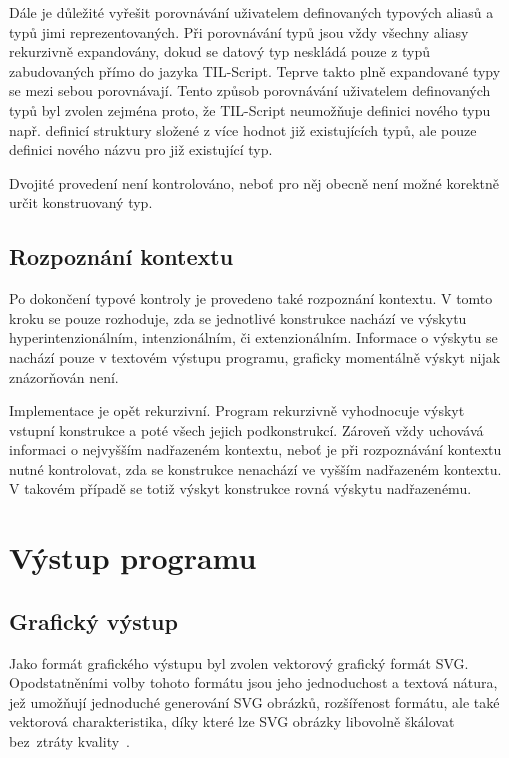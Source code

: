 \documentclass{article}
\begin{document}
Dále je důležité vyřešit porovnávání uživatelem definovaných typových aliasů a typů jimi reprezentovaných.
Při porovnávání typů jsou vždy všechny aliasy rekurzivně expandovány, dokud se datový typ neskládá pouze
z typů zabudovaných přímo do jazyka TIL-Script. Teprve takto plně expandované typy se mezi sebou porovnávají.
Tento způsob porovnávání uživatelem definovaných typů byl zvolen zejména proto, že TIL-Script neumožňuje
definici nového typu např. definicí struktury složené z více hodnot již existujících typů, ale pouze definici
nového názvu pro již existující typ.

Dvojité provedení není kontrolováno, neboť pro něj obecně není možné korektně určit konstruovaný typ.

\subsection{Rozpoznání kontextu}

Po dokončení typové kontroly je provedeno také rozpoznání kontextu. V tomto kroku se pouze rozhoduje, zda
se jednotlivé konstrukce nachází ve výskytu hyperintenzionálním, intenzionálním, či extenzionálním. Informace
o výskytu se nachází pouze v textovém výstupu programu, graficky momentálně výskyt nijak znázorňován není.

Implementace je opět rekurzivní. Program rekurzivně vyhodnocuje výskyt vstupní konstrukce a poté všech jejich
podkonstrukcí. Zároveň vždy uchovává informaci o nejvyšším nadřazeném kontextu, neboť je při rozpoznávání
kontextu nutné kontrolovat, zda se konstrukce nenachází ve vyšším nadřazeném kontextu. V takovém případě se
totiž výskyt konstrukce rovná výskytu nadřazenému.

\section{Výstup programu}

\subsection{Grafický výstup}

Jako formát grafického výstupu byl zvolen vektorový grafický formát SVG. Opodstatněními volby tohoto formátu
jsou jeho jednoduchost a textová nátura, jež umožňují jednoduché generování SVG obrázků, rozšířenost formátu,
ale také vektorová charakteristika, díky které lze SVG obrázky libovolně škálovat bez~ztráty kvality~\cite{svg-src}.
\end{document}
